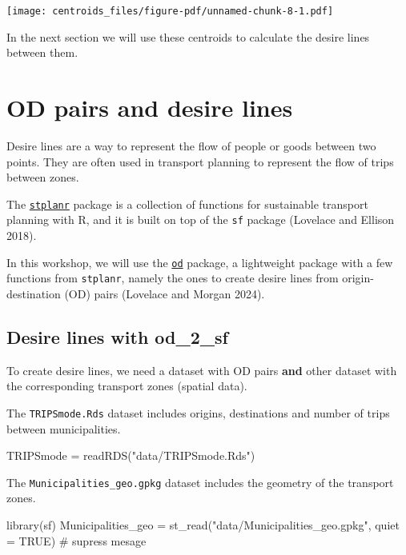 \documentclass[
  letterpaper,
  DIV=11,
  numbers=noendperiod]{scrreprt}
\newenvironment{Shaded}{\begin{snugshade}}{\end{snugshade}}
\newcommand{\AttributeTok}[1]{\textcolor[rgb]{0.40,0.45,0.13}{#1}}
\newcommand{\CommentTok}[1]{\textcolor[rgb]{0.37,0.37,0.37}{#1}}
\newcommand{\ConstantTok}[1]{\textcolor[rgb]{0.56,0.35,0.01}{#1}}
\newcommand{\FunctionTok}[1]{\textcolor[rgb]{0.28,0.35,0.67}{#1}}
\newcommand{\NormalTok}[1]{\textcolor[rgb]{0.00,0.23,0.31}{#1}}
\newcommand{\OtherTok}[1]{\textcolor[rgb]{0.00,0.23,0.31}{#1}}
\newcommand{\StringTok}[1]{\textcolor[rgb]{0.13,0.47,0.30}{#1}}
\begin{document}
\texttt{[image: centroids\_files/figure-pdf/unnamed-chunk-8-1.pdf]}

In the next section we will use these centroids to calculate the desire
lines between them.

\chapter{OD pairs and desire lines}\label{od-pairs-and-desire-lines}

Desire lines are a way to represent the flow of people or goods between
two points. They are often used in transport planning to represent the
flow of trips between zones.

The
\href{https://docs.ropensci.org/stplanr/index.html}{\texttt{stplanr}}
package is a collection of functions for sustainable transport planning
with R, and it is built on top of the \texttt{sf} package (Lovelace and
Ellison 2018).

In this workshop, we will use the
\href{https://itsleeds.github.io/od/}{\texttt{od}} package, a
lightweight package with a few functions from \texttt{stplanr}, namely
the ones to create desire lines from origin-destination (OD) pairs
(Lovelace and Morgan 2024).

\section{Desire lines with od\_2\_sf}\label{desire-lines-with-od_2_sf}

To create desire lines, we need a dataset with OD pairs \textbf{and}
other dataset with the corresponding transport zones (spatial data).

The \texttt{TRIPSmode.Rds} dataset includes origins, destinations and
number of trips between municipalities.

\begin{Shaded}
\begin{Highlighting}[]
\NormalTok{TRIPSmode }\OtherTok{=} \FunctionTok{readRDS}\NormalTok{(}\StringTok{"data/TRIPSmode.Rds"}\NormalTok{)}
\end{Highlighting}
\end{Shaded}

The \texttt{Municipalities\_geo.gpkg} dataset includes the geometry of
the transport zones.

\begin{Shaded}
\begin{Highlighting}[]
\FunctionTok{library}\NormalTok{(sf)}
\NormalTok{Municipalities\_geo }\OtherTok{=} \FunctionTok{st\_read}\NormalTok{(}\StringTok{"data/Municipalities\_geo.gpkg"}\NormalTok{, }\AttributeTok{quiet =} \ConstantTok{TRUE}\NormalTok{) }\CommentTok{\# supress mesage}
\end{Highlighting}
\end{Shaded}
\end{document}

